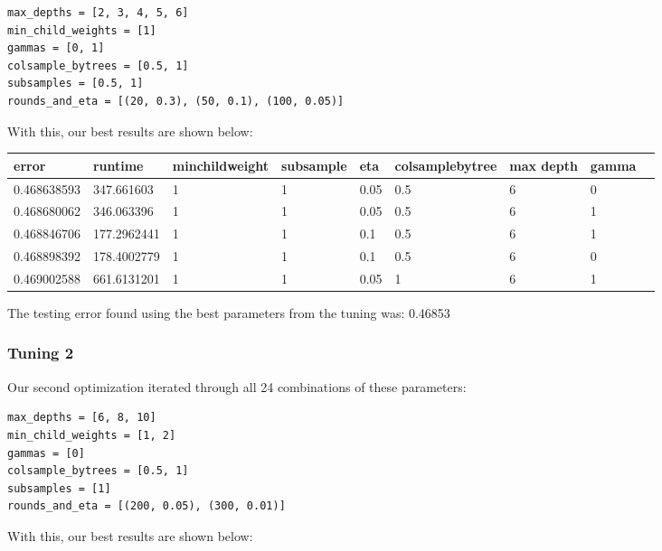 \documentclass[twoside,11pt]{article}
\theoremstyle{definition}
\begin{document}
      \begin{lstlisting}
max_depths = [2, 3, 4, 5, 6]
min_child_weights = [1]
gammas = [0, 1]
colsample_bytrees = [0.5, 1]
subsamples = [0.5, 1]
rounds_and_eta = [(20, 0.3), (50, 0.1), (100, 0.05)]
      \end{lstlisting}

      With this, our best results are shown below:

      \begin{center}
          \begin{tabular}{ | l | l | l | l | l | l | l | l | p{5cm} |}
          \hline
          error & runtime & minchildweight & subsample & eta & colsamplebytree & max depth & gamma \\ \hline
          0.468638593 & 347.661603 & 1 & 1 & 0.05 & 0.5 & 6 & 0 \\ \hline
          0.468680062 & 346.063396 & 1 & 1 & 0.05 & 0.5 & 6 & 1 \\ \hline
          0.468846706 & 177.2962441 & 1 & 1 & 0.1 & 0.5 & 6 & 1 \\ \hline
          0.468898392 & 178.4002779 & 1 & 1 & 0.1 & 0.5 & 6 & 0 \\ \hline
          0.469002588 & 661.6131201 & 1 & 1 & 0.05 & 1 & 6 & 1 \\ \hline
          \end{tabular}
      \end{center}

      The testing error found using the best parameters from the tuning was: 0.46853

    \subsubsection{Tuning 2}

      Our second optimization iterated through all 24 combinations of these parameters:

      \begin{lstlisting}
max_depths = [6, 8, 10]
min_child_weights = [1, 2]
gammas = [0]
colsample_bytrees = [0.5, 1]
subsamples = [1]
rounds_and_eta = [(200, 0.05), (300, 0.01)]
      \end{lstlisting}

      With this, our best results are shown below:
\end{document}
